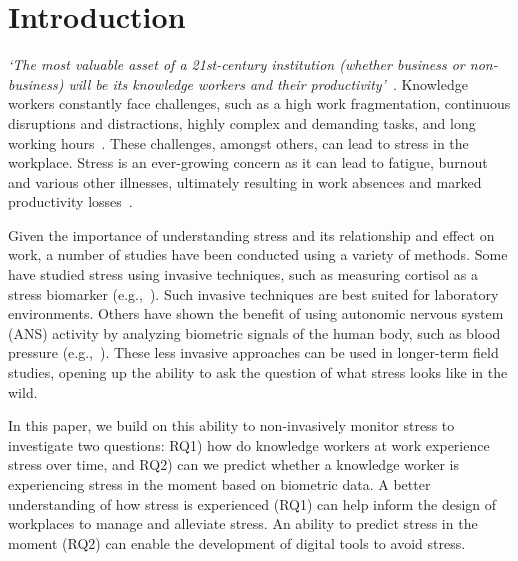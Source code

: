 \section{Introduction}
\textit{`The most valuable asset of a 21st-century institution (whether 
business or non-business) will be its knowledge workers and their 
productivity'}~\cite{drucker1999knowledge}. Knowledge workers constantly face 
challenges, such as a high work fragmentation, continuous disruptions and 
distractions, highly complex and demanding tasks, and long working 
hours~\cite{gonzalez2004constant,mark2008cost,czerwinski04diary}. 
These challenges, amongst others, can lead to stress in the workplace.
Stress is an ever-growing concern as it can lead to
fatigue, burnout and various other illnesses, ultimately resulting in work 
absences and marked productivity 
losses~\cite{hockey1997stress,setz2010stress,wrs2010}.

Given the importance of understanding stress and its relationship and
effect on work, a number of studies have been conducted using a
variety of methods. Some have studied stress using invasive
techniques, such as measuring cortisol as a stress biomarker
(e.g.,~\cite{piazza10}).  Such invasive techniques are best suited
for laboratory environments.  Others have shown the benefit of using
autonomic nervous system (ANS) activity by analyzing biometric signals
of the human body, such as blood pressure (e.g.,~\cite{kataoka00}).
These less invasive approaches can be used in longer-term field
studies, opening up the ability to ask the question of what stress
looks like in the wild. 

In this paper, we build on this ability to non-invasively monitor stress
to investigate two questions: RQ1) how do knowledge
workers at work experience stress over time, and RQ2) can we predict
whether a knowledge worker is experiencing stress in the moment based
on biometric data. A better understanding of how stress is experienced (RQ1)
can help inform the design of workplaces to manage
and alleviate stress. An ability to predict stress in the moment (RQ2)
can enable the development of digital tools to avoid stress. 

